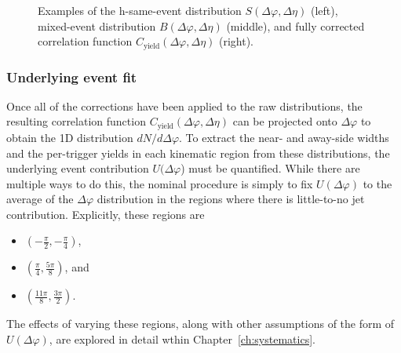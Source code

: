 \begin{figure}[t]
\caption{Examples of the h-\lmb same-event distribution $S(\Delta\varphi, \Delta\eta)$ (left), mixed-event distribution $B(\Delta\varphi, \Delta\eta)$ (middle), and fully corrected correlation function $C_{\text{yield}}(\Delta\varphi, \Delta\eta)$ (right).}
\label{fig:twod_cor}
\end{figure}

\subsubsection{Underlying event fit}
\label{sec:uefit}

Once all of the corrections have been applied to the raw distributions, the resulting correlation function $C_{\text{yield}}(\Delta\varphi, \Delta\eta)$ can be projected onto $\Delta\varphi$ to obtain the 1D distribution $dN/d\Delta\varphi$. To extract the near- and away-side widths and the per-trigger yields in each kinematic region from these distributions, the underlying event contribution $U(\Delta\varphi$) must be quantified. While there are multiple ways to do this, the nominal procedure is simply to fix $U(\Delta\varphi)$ to the average of the $\Delta\varphi$ distribution in the regions where there is little-to-no jet contribution. Explicitly, these regions are 
\begin{itemize}
\item $(-\frac{\pi}{2}, -\frac{\pi}{4})$, 
\item $(\frac{\pi}{4}, \frac{5\pi}{8})$, and
\item $(\frac{11\pi}{8}, \frac{3\pi}{2})$. 
\end{itemize}
The effects of varying these regions, along with other assumptions of the form of $U(\Delta\varphi)$, are explored in detail wthin Chapter~\ref{ch:systematics}.

